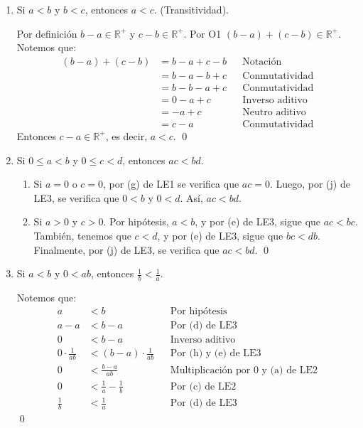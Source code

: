 \documentclass[11pt]{article}
\newcommand{\R}{\mathbb{R}}
\begin{document}
\begin{enumerate}[label=\alph*)]
    \item Si $a<b$ y $b<c$, entonces $a<c$. (Transitividad).
    
    Por definición $b-a \in \R^+$ y $c-b \in \R^+$. Por O1 $(b-a) + (c-b) \in \R^+$. Notemos que:
    \begin{align*}
        (b-a) + (c-b) &= b - a + c -b && \text{Notación}\\
        &= b-a -b+c && \text{Conmutatividad}\\
        &= b-b -a+c && \text{Conmutatividad}\\
        &= 0 - a +c && \text{Inverso aditivo}\\
        &= -a +c && \text{Neutro aditivo}\\
        &= c-a && \text{Conmutatividad}
    \end{align*} Entonces $c-a \in \R^+$, es decir, $a<c$. \qed

    \item Si $0 \leq a<b$ y $0 \leq c<d$, entonces $ac<bd$.
    
    \begin{enumerate}[label=\roman*)]
        \item Si $a=0$ o $c=0$, por (g) de LE1 se verifica que $ac=0$. Luego, por (j) de LE3, se verifica que $0<b$ y $0<d$. Así, $ac<bd$.
        \item Si $a>0$ y $c>0$. Por hipótesis, $a<b$, y por (e) de LE3, sigue que $ac<bc$. También, tenemos que $c<d$, y por (e) de LE3, sigue que $bc<db$. Finalmente, por (j) de LE3, se verifica que $ac<bd$. \qed
    \end{enumerate}

    \item Si $a<b$ y $0<ab$, entonces $\frac{1}{b}<\frac{1}{a}$.
    
    Notemos que:
    \begin{align*}
    a &< b && \text{Por hipótesis} \\
    a-a &< b-a && \text{Por (d) de LE3} \\
    0 &< b-a && \text{Inverso aditivo} \\
    0 \cdot \frac{1}{ab} &< (b-a) \cdot \frac{1}{ab} && \text{Por (h) y (e) de LE3}\\
    0 &< \frac{b-a}{ab} && \text{Multiplicación por $0$ y (a) de LE2}\\
    0 &< \frac{1}{a} - \frac{1}{b} && \text{Por (c) de LE2}\\
    \frac{1}{b} &< \frac{1}{a} && \text{Por (d) de LE3}
    \end{align*} \qed


\end{enumerate}
\end{document}
